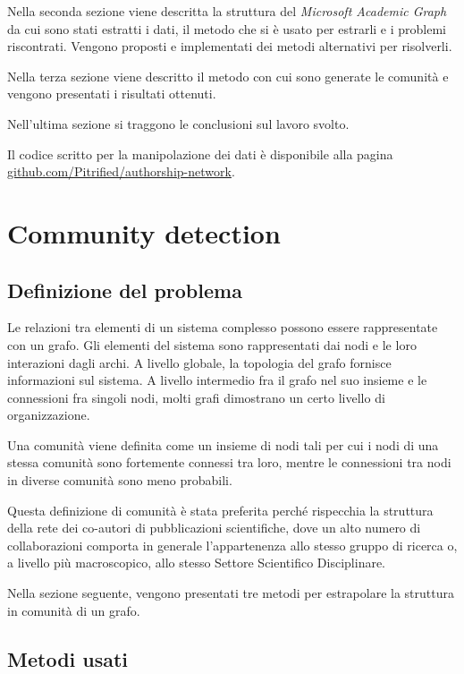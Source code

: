 \documentclass[12pt,a4paper,twoside]{report}
\begin{document}
Nella seconda sezione viene descritta la struttura del \textit{Microsoft Academic Graph} da cui sono
stati estratti i dati, il metodo che si è usato per estrarli e i problemi riscontrati. Vengono
proposti e implementati dei metodi alternativi per risolverli.

Nella terza sezione viene descritto il metodo con cui sono generate le comunità e vengono presentati
i risultati ottenuti.

Nell'ultima sezione si traggono le conclusioni sul lavoro svolto.

Il codice scritto per la manipolazione dei dati è disponibile alla pagina
\url{github.com/Pitrified/authorship-network}.


\whitePage
\chapter{Community detection} \label{cap:comdet}

\section{Definizione del problema} \label{sec:storia}

Le relazioni tra elementi di un sistema complesso possono essere rappresentate con un grafo. Gli
elementi del sistema sono rappresentati dai nodi e le loro interazioni dagli archi. A livello
globale, la topologia del grafo fornisce informazioni sul sistema. A livello intermedio fra il grafo
nel suo insieme e le connessioni fra singoli nodi, molti grafi dimostrano un certo livello di
organizzazione.

Una comunità viene definita come un insieme di nodi tali per cui i nodi di una stessa comunità sono
fortemente connessi tra loro, mentre le connessioni tra nodi in diverse comunità sono meno
probabili.

Questa definizione di comunità è stata preferita perché rispecchia la struttura della rete dei
co-autori di pubblicazioni scientifiche, dove un alto numero di collaborazioni comporta in generale
l'appartenenza allo stesso gruppo di ricerca o, a livello più macroscopico, allo stesso Settore
Scientifico Disciplinare.


Nella sezione seguente, vengono presentati tre metodi per estrapolare la struttura in comunità di un
grafo.

\section{Metodi usati} \label{sec:metodi}
\end{document}
